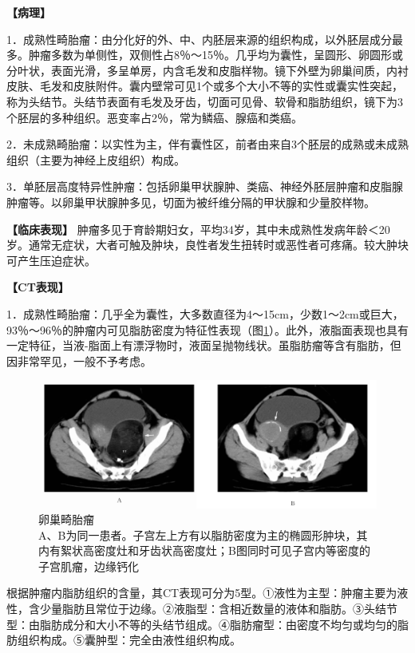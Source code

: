 \textbf{【病理】}

1．成熟性畸胎瘤：由分化好的外、中、内胚层来源的组织构成，以外胚层成分最多。肿瘤多数为单侧性，双侧性占8％～15％。几乎均为囊性，呈圆形、卵圆形或分叶状，表面光滑，多呈单房，内含毛发和皮脂样物。镜下外壁为卵巢间质，内衬皮肤、毛发和皮肤附件。囊内壁常可见1个或多个大小不等的实性或囊实性突起，称为头结节。头结节表面有毛发及牙齿，切面可见骨、软骨和脂肪组织，镜下为3个胚层的多种组织。恶变率占2％，常为鳞癌、腺癌和类癌。

2．未成熟畸胎瘤：以实性为主，伴有囊性区，前者由来自3个胚层的成熟或未成熟组织（主要为神经上皮组织）构成。

3．单胚层高度特异性肿瘤：包括卵巢甲状腺肿、类癌、神经外胚层肿瘤和皮脂腺肿瘤等。以卵巢甲状腺肿多见，切面为被纤维分隔的甲状腺和少量胶样物。

\textbf{【临床表现】}
肿瘤多见于育龄期妇女，平均34岁，其中未成熟性发病年龄＜20岁。通常无症状，大者可触及肿块，良性者发生扭转时或恶性者可疼痛。较大肿块可产生压迫症状。

\textbf{【CT表现】}

1．成熟性畸胎瘤：几乎全为囊性，大多数直径为4～15cm，少数1～2cm或巨大，93％～96％的肿瘤内可见脂肪密度为特征性表现（图\ref{fig21-13}）。此外，液脂面表现也具有一定特征，当液-脂面上有漂浮物时，液面呈抛物线状。虽脂肪瘤等含有脂肪，但因非常罕见，一般不予考虑。

\begin{figure}[!htbp]
 \centering
 \includegraphics[width=.7\textwidth,height=\textheight,keepaspectratio]{./images/Image00411.jpg}
 \captionsetup{justification=centering}
 \caption{卵巢畸胎瘤\\{\small A、B为同一患者。子宫左上方有以脂肪密度为主的椭圆形肿块，其内有絮状高密度灶和牙齿状高密度灶；B图同时可见子宫内等密度的子宫肌瘤，边缘钙化}}
 \label{fig21-13}
  \end{figure} 

根据肿瘤内脂肪组织的含量，其CT表现可分为5型。①液性为主型：肿瘤主要为液性，含少量脂肪且常位于边缘。②液脂型：含相近数量的液体和脂肪。③头结节型：由脂肪成分和大小不等的头结节组成。④脂肪瘤型：由密度不均匀或均匀的脂肪组织构成。⑤囊肿型：完全由液性组织构成。

